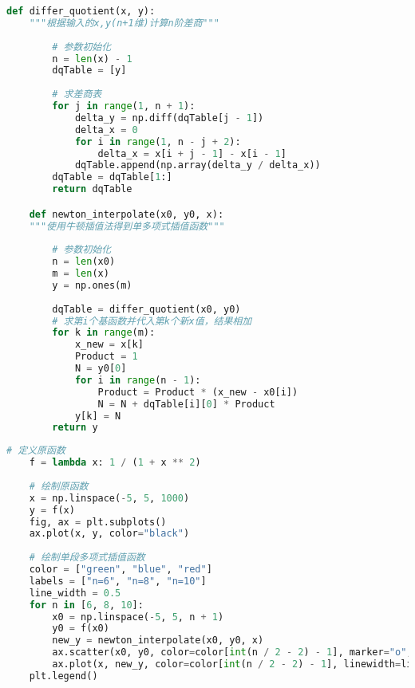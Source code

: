 \documentclass[withoutpreface]{cumcmthesis}
\begin{document}
    \begin{lstlisting}[language=python ,caption={牛顿插值法} ]
    def differ_quotient(x, y):
    """根据输入的x,y(n+1维)计算n阶差商"""
    
        # 参数初始化
        n = len(x) - 1
        dqTable = [y]
    
        # 求差商表
        for j in range(1, n + 1):
            delta_y = np.diff(dqTable[j - 1])
            delta_x = 0
            for i in range(1, n - j + 2):
                delta_x = x[i + j - 1] - x[i - 1]
            dqTable.append(np.array(delta_y / delta_x))
        dqTable = dqTable[1:]
        return dqTable

    def newton_interpolate(x0, y0, x):
    """使用牛顿插值法得到单多项式插值函数"""
    
        # 参数初始化
        n = len(x0)
        m = len(x)
        y = np.ones(m)
    
        dqTable = differ_quotient(x0, y0)
        # 求第i个基函数并代入第k个新x值，结果相加
        for k in range(m):
            x_new = x[k]
            Product = 1
            N = y0[0]
            for i in range(n - 1):
                Product = Product * (x_new - x0[i])
                N = N + dqTable[i][0] * Product
            y[k] = N
        return y
    \end{lstlisting}

    \begin{lstlisting}[language=python ,caption={龙格震荡现象} ]
    # 定义原函数
    f = lambda x: 1 / (1 + x ** 2)
    
    # 绘制原函数
    x = np.linspace(-5, 5, 1000)
    y = f(x)
    fig, ax = plt.subplots()
    ax.plot(x, y, color="black")
    
    # 绘制单段多项式插值函数
    color = ["green", "blue", "red"]
    labels = ["n=6", "n=8", "n=10"]
    line_width = 0.5
    for n in [6, 8, 10]:
        x0 = np.linspace(-5, 5, n + 1)
        y0 = f(x0)
        new_y = newton_interpolate(x0, y0, x)
        ax.scatter(x0, y0, color=color[int(n / 2 - 2) - 1], marker="o", facecolor="white", linewidth=line_width)
        ax.plot(x, new_y, color=color[int(n / 2 - 2) - 1], linewidth=line_width, label=labels[int(n / 2 - 2) - 1])
    plt.legend()
    \end{lstlisting}
\end{document}
